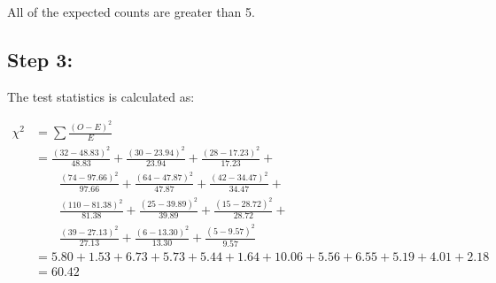 \documentclass[
]{book}
\begin{document}
All of the expected counts are greater than 5.

\hypertarget{step-3}{%
\subsection{Step 3:}\label{step-3}}

The test statistics is calculated as:

\begin{align*}
\chi^2 & = \sum \frac{(O- E)^2}{E}\\
&= \frac{(32 - 48.83)^2}{48.83} +  \frac{(30 - 23.94)^2}{23.94} +  \frac{(28 - 17.23)^2}{17.23} +\\
& \qquad \frac{(74 - 97.66)^2}{97.66} + \frac{(64 - 47.87)^2}{47.87} + \frac{(42 - 34.47)^2}{34.47} + \\
& \qquad \frac{(110 - 81.38)^2}{81.38} + \frac{(25 - 39.89)^2}{39.89} + \frac{(15 - 28.72)^2}{28.72} + \\
& \qquad \frac{(39 - 27.13)^2}{27.13} + \frac{(6 - 13.30)^2}{13.30} + \frac{(5 - 9.57)^2}{9.57} \\
&= 5.80 + 1.53 + 6.73 + 5.73 + 5.44 + 1.64 + 10.06 + 5.56 + 6.55 + 5.19 + 4.01 + 2.18\\
&= 60.42
\end{align*}
\end{document}
